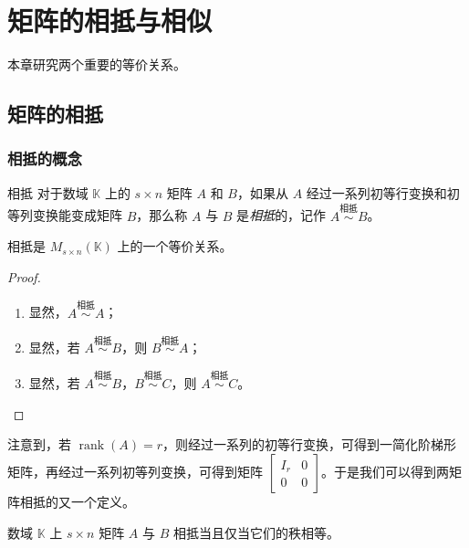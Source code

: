 
\chapter{矩阵的相抵与相似}

本章研究两个重要的等价关系。

\section{矩阵的相抵}

\subsection{相抵的概念}

\begin{definition}{相抵}
	对于数域 $\mathbb K$ 上的 $s \times n$ 矩阵 $A$ 和 $B$，如果从 $A$ 经过一系列初等行变换和初等列变换能变成矩阵 $B$，那么称 $A$ 与 $B$ 是\emph{相抵}的，记作 $A \stackrel{\text{相抵}}{\sim} B$。
\end{definition}

\begin{theorem}
	相抵是 $M_{s \times n}(\mathbb K)$ 上的一个等价关系。
\end{theorem}

\begin{proof}
	\begin{enumerate}
		\item 显然，$A \stackrel{\text{相抵}}{\sim} A$；
		\item 显然，若 $A \stackrel{\text{相抵}}{\sim} B$，则 $B \stackrel{\text{相抵}}{\sim} A$；
		\item 显然，若 $A \stackrel{\text{相抵}}{\sim} B$，$B \stackrel{\text{相抵}}{\sim} C$，则 $A \stackrel{\text{相抵}}{\sim} C$。
	\end{enumerate}
\end{proof}

注意到，若 $\operatorname{rank}(A) = r$，则经过一系列的初等行变换，可得到一简化阶梯形矩阵，再经过一系列初等列变换，可得到矩阵 $\begin{bmatrix} I_r & 0 \\ 0 & 0 \end{bmatrix}$。于是我们可以得到两矩阵相抵的又一个定义。

\begin{theorem}
	数域 $\mathbb K$ 上 $s \times n$ 矩阵 $A$ 与 $B$ 相抵当且仅当它们的秩相等。
\end{theorem}

